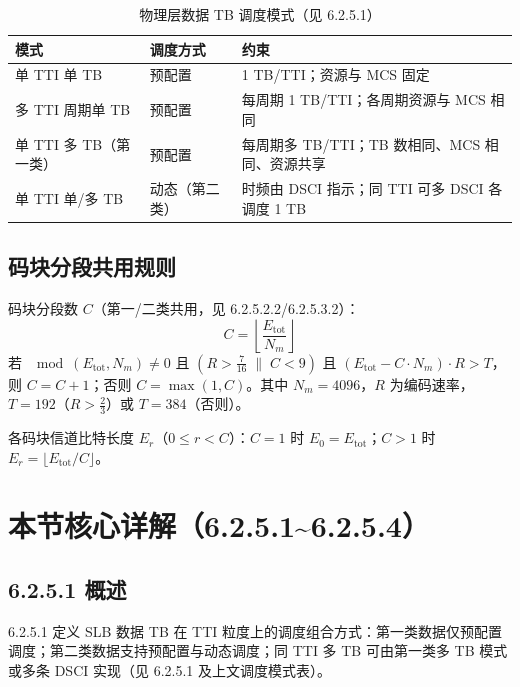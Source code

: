 \documentclass[11pt,a4paper]{ctexart}
\begin{document}
\begin{table}[h]
\centering
\small
\caption{物理层数据 TB 调度模式（见 6.2.5.1）}
\begin{tabular}{L{3.5cm}L{3.5cm}L{5.5cm}}
\toprule
\textbf{模式} & \textbf{调度方式} & \textbf{约束} \\
\midrule
单 TTI 单 TB & 预配置 & 1 TB/TTI；资源与 MCS 固定 \\
多 TTI 周期单 TB & 预配置 & 每周期 1 TB/TTI；各周期资源与 MCS 相同 \\
单 TTI 多 TB（第一类） & 预配置 & 每周期多 TB/TTI；TB 数相同、MCS 相同、资源共享 \\
单 TTI 单/多 TB & 动态（第二类） & 时频由 DSCI 指示；同 TTI 可多 DSCI 各调度 1 TB \\
\bottomrule
\end{tabular}
\end{table}

\subsection{码块分段共用规则}

码块分段数 $C$（第一/二类共用，见 6.2.5.2.2/6.2.5.3.2）：
\begin{equation}
C = \left\lfloor \frac{E_{\mathrm{tot}}}{N_m} \right\rfloor
\end{equation}
若 $\mod(E_{\mathrm{tot}}, N_m) \neq 0$ 且 $(R > \tfrac{7}{16} \;\|\; C < 9)$ 且 $(E_{\mathrm{tot}} - C \cdot N_m) \cdot R > T$，则 $C = C + 1$；否则 $C = \max(1, C)$。其中 $N_m=4096$，$R$ 为编码速率，$T = 192$（$R > \tfrac{2}{3}$）或 $T = 384$（否则）。

各码块信道比特长度 $E_r$（$0 \leq r < C$）：$C=1$ 时 $E_0 = E_{\mathrm{tot}}$；$C>1$ 时 $E_r = \lfloor E_{\mathrm{tot}} / C \rfloor$。

\section{本节核心详解（6.2.5.1\textasciitilde 6.2.5.4）}

\subsection{6.2.5.1 概述}

6.2.5.1 定义 SLB 数据 TB 在 TTI 粒度上的调度组合方式：第一类数据仅预配置调度；第二类数据支持预配置与动态调度；同 TTI 多 TB 可由第一类多 TB 模式或多条 DSCI 实现（见 6.2.5.1 及上文调度模式表）。
\end{document}
